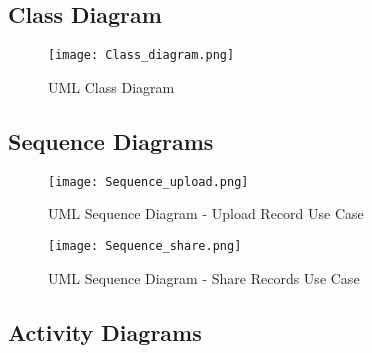 \FloatBarrier
\clearpage

\subsection{Class Diagram}
\begin{figure}[htbp]
    \centering
    \texttt{[image: Class\_diagram.png]}
    \caption{UML Class Diagram}
    \label{fig:uml_class}
\end{figure}

\FloatBarrier
\clearpage

\subsection{Sequence Diagrams}
\begin{figure}[htbp]
    \centering
    \texttt{[image: Sequence\_upload.png]}
    \caption{UML Sequence Diagram - Upload Record Use Case}
    \label{fig:sequence1}
\end{figure}

\begin{figure}[htbp]
    \centering
    \texttt{[image: Sequence\_share.png]}
    \caption{UML Sequence Diagram - Share Records Use Case}
    \label{fig:sequence2}
\end{figure}

\FloatBarrier

\noindent\begin{minipage}{\textwidth}
    \subsection{Activity Diagrams}
    \begin{center}
        \label{fig:activity1}
    \end{center}
\end{minipage}

\noindent\begin{minipage}{\textwidth}
    \begin{center}
        \label{fig:activity2}
    \end{center}
\end{minipage}

